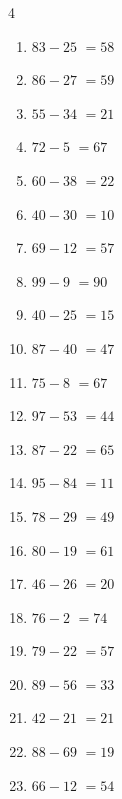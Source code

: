\begin{multicols}{4}
\begin{enumerate}
  \item $83-25$
        $=58$

  \item $86-27$
        $=59$

  \item $55-34$
        $=21$

  \item $72-5$
        $=67$

  \item $60-38$
        $=22$

\columnbreak %

\resetques

  \item $40-30$
        $=10$

  \item $69-12$
        $=57$

  \item $99-9$
        $=90$

  \item $40-25$
        $=15$

  \item $87-40$
        $=47$

  \item $75-8$
        $=67$

  \item $97-53$
        $=44$

  \item $87-22$
        $=65$

  \item $95-84$
        $=11$

  \item $78-29$
        $=49$

  \item $80-19$
        $=61$

  \item $46-26$
        $=20$

  \item $76-2$
        $=74$

  \item $79-22$
        $=57$

  \item $89-56$
        $=33$

  \item $42-21$
        $=21$

  \item $88-69$
        $=19$

  \item $66-12$
        $=54$


\end{enumerate}
\end{multicols}
